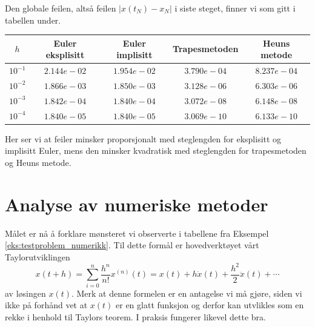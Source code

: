 \documentclass{article}
\theoremstyle{plain}
\theoremstyle{definition}
\theoremstyle{remark}
\newenvironment{ex}
{\pushQED{\qed}\renewcommand{\qedsymbol}{$\triangle$}\exx}
{\popQED\endexx}
\newcommand{\fcn}{x}
\newcommand{\abs}[1]{|#1|}
\begin{document}
\begin{ex}
    Den globale feilen, altså feilen $\abs{\fcn(t_N) - \fcn_N}$ i siste steget, finner vi som gitt i tabellen under.
    \begin{center}
        \begin{tabular}{c | c | c | c | c}
            $h$ & Euler eksplisitt & Euler implisitt & Trapesmetoden & Heuns metode \\
            \hline
            $10^{-1}$ & $2.144e-02$ & $1.954e-02$ & $3.790e-04$ & $8.237e-04$ \\
            $10^{-2}$ & $1.866e-03$ & $1.850e-03$ & $3.128e-06$ & $6.303e-06$ \\
            $10^{-3}$ & $1.842e-04$ & $1.840e-04$ & $3.072e-08$ & $6.148e-08$ \\
            $10^{-4}$ & $1.840e-05$ & $1.840e-05$ & $3.069e-10$ & $6.133e-10$
        \end{tabular}
    \end{center}
    Her ser vi at feiler minsker proporsjonalt med steglengden for eksplisitt og implisitt Euler, mens den minsker kvadratisk med steglengden for trapesmetoden og Heuns metode.
\end{ex}


\section*{Analyse av numeriske metoder}

Målet er nå å forklare mønsteret vi observerte i tabellene fra Eksempel \ref{eks:testproblem_numerikk}. Til dette formål er hovedverktøyet vårt Taylorutviklingen
\begin{equation} \label{eq:taylor}
    \fcn(t + h) = \sum_{i=0}^n \frac{h^n}{n!}\fcn^{(n)}(t) = \fcn(t) + h \dot{\fcn}(t) + \frac{h^2}{2} \ddot{\fcn}(t) + \cdots
\end{equation}
av løsingen $\fcn(t)$. Merk at denne formelen er en antagelse vi må gjøre, siden vi ikke på forhånd vet at $\fcn(t)$ er en glatt funksjon og derfor kan utvlikles som en rekke i henhold til Taylors teorem. I praksis fungerer likevel dette bra.
\end{document}

